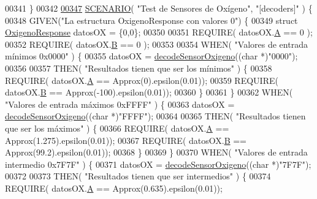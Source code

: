 \begin{DoxyCode}
{{{00341 \}
00342 
\hyperlink{UnitTestCase_8cpp_aa6afb62ebdd4c3e07996c995f623eb6b}{00347} \hyperlink{UnitTestCase_8cpp_aa6afb62ebdd4c3e07996c995f623eb6b}{SCENARIO}( \textcolor{stringliteral}{"Test de Sensores de Oxígeno"}, \textcolor{stringliteral}{"[decoders]"} ) \{
00348     GIVEN(\textcolor{stringliteral}{"La estructura OxigenoResponse con valores 0"}) \{
00349         \textcolor{keyword}{struct }\hyperlink{structOxigenoResponse}{OxigenoResponse} datosOX = \{0,0\};
00350 
00351         REQUIRE( datosOX.\hyperlink{structOxigenoResponse_a068c403e5746226cf22bb020b4c786d3}{A} == 0 );
00352         REQUIRE( datosOX.\hyperlink{structOxigenoResponse_a96b19152dd001e19d1351e2d97f22736}{B} == 0 );
00353 
00354         WHEN( \textcolor{stringliteral}{"Valores de entrada mínimos 0x0000"} ) \{
00355             datosOX = \hyperlink{decoders_8cpp_a5b53fc5fc37fbee9c5e389f6c8c18438}{decodeSensorOxigeno}((\textcolor{keywordtype}{char} *)\textcolor{stringliteral}{"0000"});
00356 
00357             THEN( \textcolor{stringliteral}{"Resultados tienen que ser los mínimos"} ) \{
00358                 REQUIRE( datosOX.\hyperlink{structOxigenoResponse_a068c403e5746226cf22bb020b4c786d3}{A} == Approx(0).epsilon(0.01));
00359                 REQUIRE( datosOX.\hyperlink{structOxigenoResponse_a96b19152dd001e19d1351e2d97f22736}{B} == Approx(-100).epsilon(0.01));
00360             \}
00361         \}
00362         WHEN( \textcolor{stringliteral}{"Valores de entrada máximos 0xFFFF"} ) \{
00363             datosOX = \hyperlink{decoders_8cpp_a5b53fc5fc37fbee9c5e389f6c8c18438}{decodeSensorOxigeno}((\textcolor{keywordtype}{char} *)\textcolor{stringliteral}{"FFFF"});
00364 
00365             THEN( \textcolor{stringliteral}{"Resultados tienen que ser los máximos"} ) \{
00366                 REQUIRE( datosOX.\hyperlink{structOxigenoResponse_a068c403e5746226cf22bb020b4c786d3}{A} == Approx(1.275).epsilon(0.01));
00367                 REQUIRE( datosOX.\hyperlink{structOxigenoResponse_a96b19152dd001e19d1351e2d97f22736}{B} == Approx(99.2).epsilon(0.01));
00368             \}
00369         \}
00370         WHEN( \textcolor{stringliteral}{"Valores de entrada intermedio 0x7F7F"} ) \{
00371             datosOX = \hyperlink{decoders_8cpp_a5b53fc5fc37fbee9c5e389f6c8c18438}{decodeSensorOxigeno}((\textcolor{keywordtype}{char} *)\textcolor{stringliteral}{"7F7F"});
00372 
00373             THEN( \textcolor{stringliteral}{"Resultados tienen que ser intermedios"} ) \{
00374                 REQUIRE( datosOX.\hyperlink{structOxigenoResponse_a068c403e5746226cf22bb020b4c786d3}{A} == Approx(0.635).epsilon(0.01));
}}}
\end{DoxyCode}
